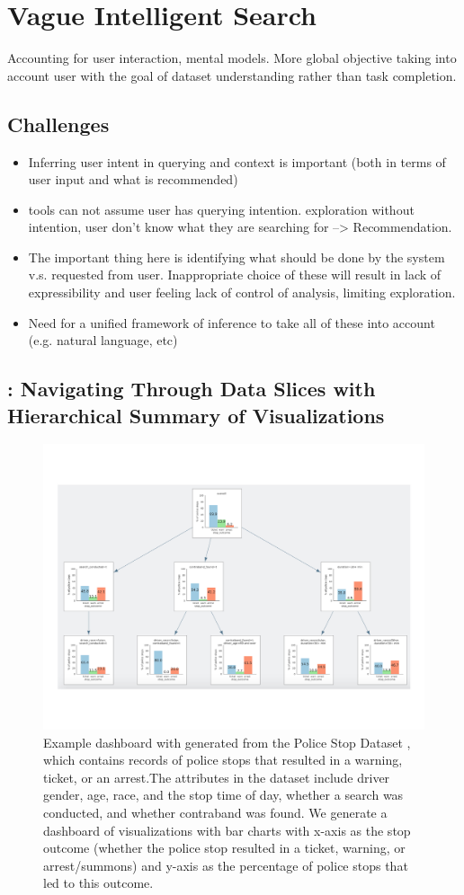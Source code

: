 \section{Vague Intelligent Search\label{sec:vague}}
Accounting for user interaction, mental models. More global objective taking into account user with the goal of dataset understanding rather than task completion.
\subsection{Challenges}
\begin{itemize}
\item Inferring user intent in querying and context is important (both in terms of user input and what is recommended)
\item tools can not assume user has querying intention. exploration without intention, user don’t know what they are searching for --> Recommendation.
\item The important thing here is identifying what should be done by the system v.s. requested from user. Inappropriate choice of these will result in lack of expressibility and user feeling lack of control of analysis, limiting exploration.
\item Need for a unified framework of inference to take all of these into account (e.g. natural language, etc)
\end{itemize}
\subsection{\sbd: Navigating Through Data Slices with Hierarchical Summary of Visualizations}

\begin{figure}[h!]
\label{fig:modalities}
\centering
\includegraphics[width=0.7\linewidth]{figures/storyboard.pdf}
\caption{Example dashboard with generated from the Police Stop Dataset \cite{police}, which contains records of police stops that resulted in a warning, ticket, or an arrest.The attributes in the dataset include driver gender, age, race, and the stop time of day, whether a search was conducted, and whether contraband was found. We generate a dashboard of visualizations with bar charts with x-axis as the stop outcome (whether the police stop resulted in a ticket, warning, or arrest/summons) and y-axis as the percentage of police stops that led to this outcome.}
\end{figure}

